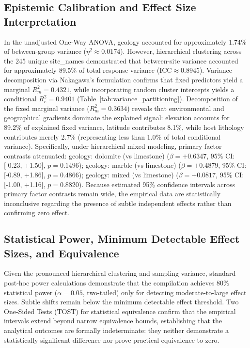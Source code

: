 \documentclass[sn-basic,Numbered]{sn-jnl}%
\begin{document}
\subsection{Epistemic Calibration and Effect Size Interpretation}
In the unadjusted One-Way ANOVA, geology accounted for approximately 1.74\% of between-group variance ($\eta^2 \approx 0.0174$). However, hierarchical clustering across the 245 unique site\_names demonstrated that between-site variance accounted for approximately 89.5\% of total response variance ($\text{ICC} \approx 0.8945$). Variance decomposition via Nakagawa's formulation confirms that fixed predictors yield a marginal $R^2_m = 0.4321$, while incorporating random cluster intercepts yields a conditional $R^2_c = 0.9401$ (Table~\ref{tab:variance_partitioning}). Decomposition of the fixed marginal variance ($R^2_m = 0.3634$) reveals that environmental and geographical gradients dominate the explained signal: elevation accounts for 89.2\% of explained fixed variance, latitude contributes 8.1\%, while host lithology contributes merely 2.7\% (representing less than 1.0\% of total conditional variance). Specifically, under hierarchical mixed modeling, primary factor contrasts attenuated: geology: dolomite (vs limestone) ($\beta = +0.6347$, 95\% CI: [-0.23, +1.50], $p = 0.1496$); geology: marble (vs limestone) ($\beta = +0.4879$, 95\% CI: [-0.89, +1.86], $p = 0.4866$); geology: mixed (vs limestone) ($\beta = +0.0817$, 95\% CI: [-1.00, +1.16], $p = 0.8820$). Because estimated 95\% confidence intervals across primary factor contrasts remain wide, the empirical data are statistically inconclusive regarding the presence of subtle independent effects rather than confirming zero effect.

\subsection{Statistical Power, Minimum Detectable Effect Sizes, and Equivalence}
Given the pronounced hierarchical clustering and sampling variance, standard post-hoc power calculations demonstrate that the compilation achieves 80\% statistical power ($\alpha = 0.05$, two-tailed) only for detecting moderate-to-large effect sizes. Subtle shifts remain below the minimum detectable effect threshold. Two One-Sided Tests (TOST) for statistical equivalence confirm that the empirical intervals extend beyond narrow equivalence bounds, establishing that the analytical outcomes are formally indeterminate: they neither demonstrate a statistically significant difference nor prove practical equivalence to zero.
\end{document}
